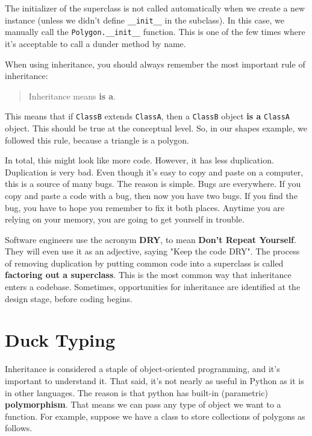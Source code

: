 The initializer of the superclass is not called automatically when we create a new instance (unless we didn’t define \texttt{\_\_init\_\_} in the subclass).  In this case, we manually call the \texttt{Polygon.\_\_init\_\_} function.  This is one of the few times where it’s acceptable to call a dunder method by name.


When using inheritance, you should always remember the most important rule of inheritance:

\begin{quote}

Inheritance means \textbf{is a}.

\end{quote}

This means that if \texttt{ClassB} extends \texttt{ClassA}, then a \texttt{ClassB} object \textbf{is a} \texttt{ClassA} object.  This should be true at the conceptual level.  So, in our shapes example, we followed this rule, because a triangle is a polygon.  


In total, this might look like more code.  However, it has less duplication.  Duplication is very bad.  Even though it’s easy to copy and paste on a computer, this is a source of many bugs.  The reason is simple.  Bugs are everywhere.  If you copy and paste a code with a bug, then now you have two bugs.  If you find the bug, you have to hope you remember to fix it both places.  Anytime you are relying on your memory, you are going to get yourself in trouble.  


Software engineers use the acronym \textbf{DRY}, to mean \textbf{Don’t Repeat Yourself}.  They will even use it as an adjective, saying "Keep the code DRY".   The process of removing duplication by putting common code into a superclass is called \textbf{factoring out a superclass}.  This is the most common way that inheritance enters a codebase.  Sometimes, opportunities for inheritance are identified at the design stage, before coding begins.

\section{Duck Typing}


Inheritance is considered a staple of object-oriented programming, and it’s important to understand it.  That said, it’s not nearly as useful in Python as it is in other languages.  The reason is that python has built-in (parametric) \textbf{polymorphism}.   That means we can pass any type of object we want to a function.  For example, suppose we have a class to store collections of polygons as follows.

